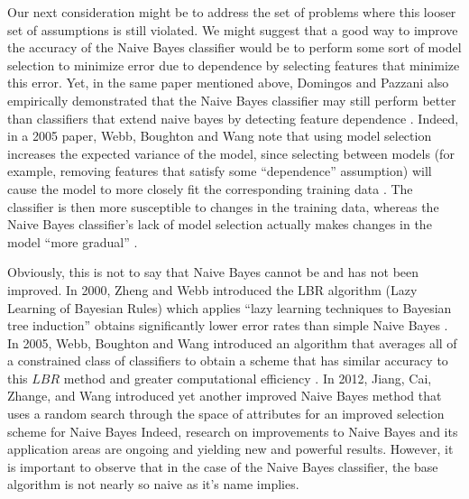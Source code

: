 \documentclass[12pt]{article}
\begin{document}
Our next consideration might be to address the set of problems where this looser set of assumptions is still violated.
We might suggest that a good way to improve the accuracy of the Naive Bayes classifier would be to perform some sort of model selection to minimize error due to dependence by selecting features that minimize this error.
Yet, in the same paper mentioned above, Domingos and Pazzani also empirically demonstrated that the Naive Bayes classifier may still perform better than classifiers that extend naive bayes by detecting feature dependence \cite{Domingos1997}. 
Indeed, in a 2005 paper, Webb, Boughton and Wang note that using model selection increases the expected variance of the model, since selecting between models (for example, removing features that satisfy some ``dependence'' assumption) will cause the model to more closely fit the corresponding training data \cite{Webb2005}.
The classifier is then more susceptible to changes in the training data, whereas the Naive Bayes classifier's lack of model selection actually makes changes in the model ``more gradual'' \cite{Webb2005}.

Obviously, this is not to say that Naive Bayes cannot be and has not been improved. 
In 2000, Zheng and Webb introduced the LBR algorithm (Lazy Learning of Bayesian Rules) which applies ``lazy learning techniques to Bayesian tree induction'' obtains significantly lower error rates than simple Naive Bayes \cite{Zheng2000}.
In 2005, Webb, Boughton and Wang introduced an algorithm that averages all of a constrained class of classifiers to obtain a scheme that has similar accuracy to this $LBR$ method and greater computational efficiency \cite{Webb2005}.
In 2012, Jiang, Cai, Zhange, and Wang introduced yet another improved Naive Bayes method that uses a random search through the space of attributes for an improved selection scheme for Naive Bayes \cite{Jiang201211022}
Indeed, research on improvements to Naive Bayes and its application areas are ongoing and yielding new and powerful results.
However, it is important to observe that in the case of the Naive Bayes classifier, the base algorithm is not nearly so naive as it's name implies.




\end{document}
